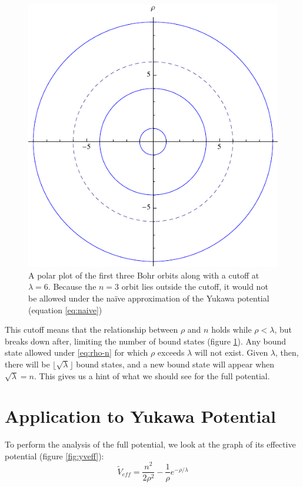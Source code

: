 \documentclass[12pt,twoside]{reedthesis}
\newcommand{\eqn}[1]{\begin{equation}#1\end{equation}}
\newcommand{\fig}[2]{\begin{figure}\begin{center}#1\end{center}#2\end{figure}}
\begin{document}
\fig{
\includegraphics{Figures/cutoff}}
{
\label{fig:cutoff}
\caption{A polar plot of the first three Bohr orbits along with a cutoff at $\lambda = 6$. Because the $n=3$ orbit lies outside the cutoff, it would not be allowed under the na\"ive approximation of the Yukawa potential (equation \eqref{eq:naive})}
}

This cutoff means that the relationship between $\rho$ and $n$ holds while $\rho < \lambda$, but breaks down after, limiting the number of bound states (figure \ref{fig:cutoff}). Any bound state allowed under \eqref{eq:rho-n} for which $\rho$ exceeds $\lambda$ will not exist. Given $\lambda$, then, there will be $\lfloor \sqrt{\lambda} \rfloor$ bound states, and a new bound state will appear when $\sqrt{\lambda} = n$. This gives us a hint of what we should see for the full potential.
\section{Application to Yukawa Potential}
To perform the analysis of the full potential, we look at the graph of its effective potential (figure \ref{fig:yveff}):
\eqn{
\tilde{V}_{eff} = \frac{n^2}{2 \rho^2} - \frac{1}{\rho}e^{-\rho/\lambda}
\label{eq:yveff}
}
 
\end{document}
